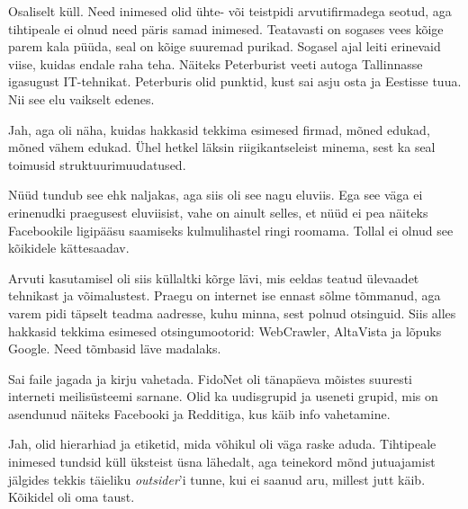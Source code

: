 
Osaliselt küll. Need inimesed olid ühte- või teistpidi 
arvutifirmadega seotud, aga tihtipeale ei olnud need päris samad 
inimesed. Teatavasti on sogases vees kõige parem kala püüda, seal on kõige 
suuremad purikad. Sogasel ajal leiti erinevaid viise, kuidas endale 
raha teha. Näiteks Peterburist veeti autoga Tallinnasse igasugust IT-tehnikat. Peterburis olid punktid, kust sai asju 
osta ja Eestisse tuua. Nii see elu vaikselt edenes.


Jah, aga oli näha, kuidas hakkasid tekkima esimesed firmad, mõned edukad, 
mõned vähem edukad. Ühel hetkel läksin riigikantseleist 
minema, sest ka seal toimusid struktuurimuudatused.


Nüüd tundub see ehk naljakas, aga siis oli see nagu eluviis. Ega see väga ei erinenudki praegusest eluviisist, vahe on ainult selles, 
et nüüd ei pea näiteks Facebookile ligipääsu saamiseks kulmulihastel ringi roomama. Tollal ei olnud see kõikidele kättesaadav. 

Arvuti kasutamisel oli siis küllaltki kõrge lävi, mis eeldas teatud ülevaadet tehnikast ja võimalustest. Praegu on internet ise ennast 
sõlme tõmmanud, aga varem pidi täpselt teadma aadresse, 
kuhu minna, sest polnud otsinguid. Siis alles hakkasid tekkima esimesed 
otsingumootorid: WebCrawler, AltaVista ja lõpuks Google. Need tõmbasid läve madalaks. 


Sai faile jagada ja kirju vahetada. FidoNet oli tänapäeva mõistes suuresti
interneti meilisüsteemi sarnane. Olid ka uudisgrupid ja useneti grupid, mis on asendunud näiteks Facebooki ja Redditiga, kus käib 
info vahetamine.


Jah, olid hierarhiad ja etiketid, mida võhikul oli väga raske 
aduda. Tihtipeale inimesed tundsid küll üksteist üsna lähedalt, aga 
teinekord mõnd jutuajamist jälgides tekkis täieliku \emph{outsider}'i tunne, kui ei saanud aru, millest jutt käib. Kõikidel oli oma taust.


